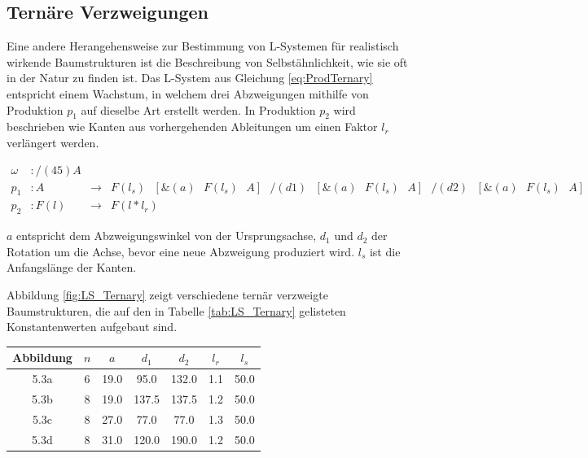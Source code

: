\subsection{Ternäre Verzweigungen}

Eine andere Herangehensweise zur Bestimmung von L-Systemen für realistisch wirkende Baumstrukturen ist die Beschreibung von Selbstähnlichkeit, wie sie oft in der Natur zu finden ist. \cite[S.173]{ABOP:04} Das L-System aus Gleichung \ref{eq:ProdTernary} entspricht einem Wachstum, in welchem drei Abzweigungen mithilfe von Produktion $p_1$ auf dieselbe Art erstellt werden. In Produktion $p_2$ wird beschrieben wie Kanten aus vorhergehenden Ableitungen um einen Faktor $l_r$ verlängert werden. \cite[S.58]{ABOP:04}

\begin{equation}
\begin{array}{llll}
\omega & : /(45)A \\
p_1 & : A &\rightarrow& F(l_s)\text{ }[\&(a)\text{ }F(l_s)\text{ }A]\text{ }/(d1)\text{ }[\&(a)\text{ }F(l_s)\text{ }A]\text{ }/(d2)\text{ }[\&(a)\text{ }F(l_s)\text{ }A] \\
p_2 &  : F(l) &\rightarrow& F(l * l_r)
\end{array}
\label{eq:ProdTernary}
\end{equation} 
\cite[S.60]{ABOP:04}

$a$ entspricht dem Abzweigungswinkel von der Ursprungsachse, $d_1$ und $d_2$ der Rotation um die Achse, bevor eine neue Abzweigung produziert wird. $l_s$ ist die Anfangslänge der Kanten. \cite[S.58]{ABOP:04}

Abbildung \ref{fig:LS_Ternary} zeigt verschiedene ternär verzweigte Baumstrukturen, die auf den in Tabelle \ref{tab:LS_Ternary} gelisteten Konstantenwerten aufgebaut sind.

\begin{center}
	\begin{tabulary}{\textwidth}{|C|C|C|C|C|C|C|}
		\hline 
		Abbildung & $n$ & $a$ & $d_1$ & $d_2$ & $l_r$ & $l_s$ \\ 
		\hline 
		5.3a & 6 & 19.0 & 95.0 & 132.0 & 1.1 & 50.0 \\ 
		\hline 
		5.3b & 8 & 19.0 & 137.5 & 137.5 & 1.2 & 50.0 \\ 
		\hline 
		5.3c & 8 & 27.0 & 77.0 & 77.0 & 1.3 & 50.0 \\ 
		\hline 
		5.3d & 8 & 31.0 & 120.0 & 190.0 & 1.2 & 50.0 \\ 
		\hline 
	\end{tabulary} 
	\label{tab:LS_Ternary}
\end{center}

